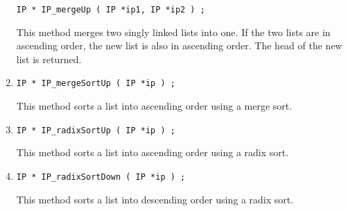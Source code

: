 \begin{enumerate}
\begin{verbatim}
IP * IP_mergeUp ( IP *ip1, IP *ip2 ) ;
\end{verbatim}
This method merges two singly linked lists into one.
If the two lists are in ascending order,
the new list is also in ascending order.
The head of the new list is returned.
\item
\begin{verbatim}
IP * IP_mergeSortUp ( IP *ip ) ;
\end{verbatim}
This method sorts a list into ascending order using a merge sort.
\item
\begin{verbatim}
IP * IP_radixSortUp ( IP *ip ) ;
\end{verbatim}
This method sorts a list into ascending order using a radix sort.
\item
\begin{verbatim}
IP * IP_radixSortDown ( IP *ip ) ;
\end{verbatim}
This method sorts a list into descending order using a radix sort.
\end{enumerate}
